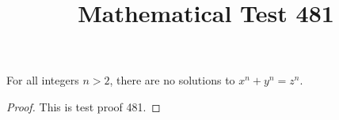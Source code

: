 \documentclass{amsart}
\begin{document}
\title{Mathematical Test 481}
\begin{theorem}
For all integers $n > 2$, there are no solutions to $x^n + y^n = z^n$.
\end{theorem}
\begin{proof}
This is test proof 481.
\end{proof}
\end{document}
